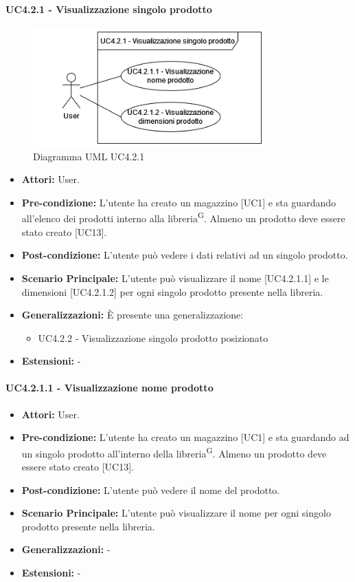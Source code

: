 \paragraph{UC4.2.1 - Visualizzazione singolo prodotto}
\begin{figure}[H]
  \centering
  \includegraphics[width=0.8\textwidth]{UC_diagrams_1-10/UC4.2.1.drawio.png}
   \caption{Diagramma UML UC4.2.1}
\end{figure}
\begin{itemize} 
    \item \textbf{Attori:} User.
    \item \textbf{Pre-condizione:}  L'utente ha creato un magazzino [UC1] e sta guardando all'elenco dei prodotti interno alla libreria\textsuperscript{G}. Almeno un prodotto deve essere stato creato [UC13].
    \item \textbf{Post-condizione:} L'utente può vedere i dati relativi ad un singolo prodotto.
    \item \textbf{Scenario Principale:} L'utente può visualizzare il nome [UC4.2.1.1] e le dimensioni [UC4.2.1.2] per ogni singolo prodotto presente nella libreria. 
    \item \textbf{Generalizzazioni:} È presente una generalizzazione:
    \begin{itemize}
        \item UC4.2.2 - Visualizzazione singolo prodotto posizionato
    \end{itemize}
    \item \textbf{Estensioni:} -
\end{itemize}


\paragraph{UC4.2.1.1 - Visualizzazione nome prodotto}
\begin{itemize} 
    \item \textbf{Attori:} User.
    \item \textbf{Pre-condizione:}  L'utente ha creato un magazzino [UC1] e sta guardando ad un singolo prodotto all'interno della libreria\textsuperscript{G}. Almeno un prodotto deve essere stato creato [UC13].
    \item \textbf{Post-condizione:} L'utente può vedere il nome del prodotto.
    \item \textbf{Scenario Principale:} L'utente può visualizzare il nome per ogni singolo prodotto presente nella libreria. 
    \item \textbf{Generalizzazioni:} -
    \item \textbf{Estensioni:} -
\end{itemize}


